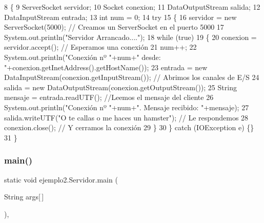 \begin{DoxyCode}
8     \{
9         ServerSocket servidor;
10         Socket conexion;
11         DataOutputStream salida;
12         DataInputStream entrada;
13         \textcolor{keywordtype}{int} num = 0;
14         \textcolor{keywordflow}{try}
15         \{
16             servidor = \textcolor{keyword}{new} ServerSocket(5000); \textcolor{comment}{// Creamos un ServerSocket en el puerto 5000}
17             System.out.println(\textcolor{stringliteral}{"Servidor Arrancado...."});
18             \textcolor{keywordflow}{while} (\textcolor{keyword}{true})
19             \{
20                 conexion = servidor.accept();     \textcolor{comment}{// Esperamos una conexión}
21                 num++;
22                 System.out.println(\textcolor{stringliteral}{"Conexión nº "}+num+\textcolor{stringliteral}{" desde: "}+conexion.getInetAddress().getHostName());
23                 entrada = \textcolor{keyword}{new} DataInputStream(conexion.getInputStream());  \textcolor{comment}{// Abrimos los canales de E/S}
24                 salida  = \textcolor{keyword}{new} DataOutputStream(conexion.getOutputStream());
25                 String mensaje = entrada.readUTF();    \textcolor{comment}{//Leemos el mensaje del cliente}
26                 System.out.println(\textcolor{stringliteral}{"Conexión nº "}+num+\textcolor{stringliteral}{". Mensaje recibido: "}+mensaje);
27                 salida.writeUTF(\textcolor{stringliteral}{"O te callas o me haces un hamster"});  \textcolor{comment}{// Le respondemos}
28                 conexion.close();                           \textcolor{comment}{// Y cerramos la conexión}
29             \}
30         \} \textcolor{keywordflow}{catch} (IOException e) \{\}
31     \}
\end{DoxyCode}
\mbox{\label{classejemplo2_1_1_servidor_aa867aa19fe8670511d9ae325b1b60be7}} 
\subsubsection{\texorpdfstring{main()}{main()}\hspace{0.1cm}{\footnotesize\ttfamily [2/2]}}
{\footnotesize\ttfamily static void ejemplo2.\+Servidor.\+main (\begin{DoxyParamCaption}\item[{String}]{args\mbox{[}$\,$\mbox{]} }\end{DoxyParamCaption})\hspace{0.3cm}{\ttfamily [inline]}, {\ttfamily [static]}}


